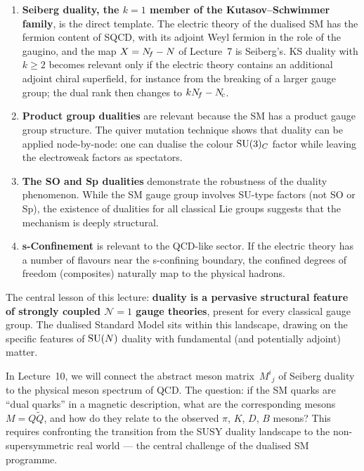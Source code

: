 \documentclass[11pt,a4paper]{article}
\begin{document}
\begin{enumerate}
  \item \textbf{Seiberg duality, the $k = 1$ member of the
    Kutasov--Schwimmer family}, is the direct template.  The electric
    theory of the dualised SM has the fermion content of SQCD, with its
    adjoint Weyl fermion in the role of the gaugino, and the map
    $X = N_{\!f} - N$ of Lecture~7 is Seiberg's.  KS duality with
    $k \geq 2$ becomes relevant only if the electric theory contains an
    additional adjoint chiral superfield, for instance from the
    breaking of a larger gauge group; the dual rank then changes to
    $kN_{\!f} - N_{\!c}$.

  \item \textbf{Product group dualities} are relevant because the SM
    has a product gauge group structure.  The quiver mutation
    technique shows that duality can be applied node-by-node: one can
    dualise the colour $\mathrm{SU}(3)_C$ factor while leaving the
    electroweak factors as spectators.

  \item \textbf{The SO and Sp dualities} demonstrate the robustness
    of the duality phenomenon.  While the SM gauge group involves
    SU-type factors (not SO or Sp), the existence of dualities for
    all classical Lie groups suggests that the mechanism is deeply
    structural.

  \item \textbf{s-Confinement} is relevant to the QCD-like
    sector.  If the electric theory has a number of flavours near the
    s-confining boundary, the confined degrees of freedom
    (composites) naturally map to the physical hadrons.
\end{enumerate}

The central lesson of this lecture: \textbf{duality is a pervasive
structural feature of strongly coupled $\mathcal{N}=1$ gauge
theories}, present for every classical gauge group.
The dualised Standard Model sits within this landscape, drawing on
the specific features of $\mathrm{SU}(N)$ duality with fundamental (and
potentially adjoint) matter.

\begin{previewbox}[title={Preview: Lecture 10}]
  In Lecture~10, we will connect the abstract meson matrix~$M^i{}_j$
  of Seiberg duality to the physical meson spectrum of QCD.  The
  question: if the SM quarks are ``dual quarks'' in a magnetic
  description, what are the corresponding mesons $M = Q\widetilde{Q}$,
  and how do they relate to the observed $\pi$, $K$, $D$, $B$
  mesons?  This requires confronting the transition from the SUSY
  duality landscape to the non-supersymmetric real world --- the
  central challenge of the dualised SM programme.
\end{previewbox}
\end{document}
